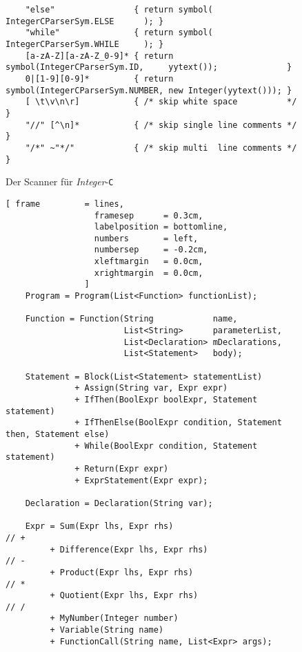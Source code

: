 \begin{figure}[!ht]
\begin{Verbatim}
    "else"                { return symbol( IntegerCParserSym.ELSE      ); }
    "while"               { return symbol( IntegerCParserSym.WHILE     ); }   
    [a-zA-Z][a-zA-Z_0-9]* { return symbol(IntegerCParserSym.ID,     yytext());              }
    0|[1-9][0-9]*         { return symbol(IntegerCParserSym.NUMBER, new Integer(yytext())); }
    [ \t\v\n\r]           { /* skip white space          */ }   
    "//" [^\n]*           { /* skip single line comments */ }   
    "/*" ~"*/"            { /* skip multi  line comments */ }   
\end{Verbatim}
\vspace*{-0.3cm}
\caption{Der Scanner f\"ur \textsl{Integer}-\texttt{C}}
\label{fig:compiler.jflex}
\end{figure}


\begin{figure}[!ht]
\centering
\begin{Verbatim}[ frame         = lines, 
                  framesep      = 0.3cm, 
                  labelposition = bottomline,
                  numbers       = left,
                  numbersep     = -0.2cm,
                  xleftmargin   = 0.0cm,
                  xrightmargin  = 0.0cm,
                ]
    Program = Program(List<Function> functionList);
    
    Function = Function(String            name, 
                        List<String>      parameterList, 
                        List<Declaration> mDeclarations,
                        List<Statement>   body);
    
    Statement = Block(List<Statement> statementList)
              + Assign(String var, Expr expr)
              + IfThen(BoolExpr boolExpr, Statement statement)
              + IfThenElse(BoolExpr condition, Statement then, Statement else)
              + While(BoolExpr condition, Statement statement)
              + Return(Expr expr)
              + ExprStatement(Expr expr);
    
    Declaration = Declaration(String var);
    
    Expr = Sum(Expr lhs, Expr rhs)                        // +
         + Difference(Expr lhs, Expr rhs)                 // -
         + Product(Expr lhs, Expr rhs)                    // *
         + Quotient(Expr lhs, Expr rhs)                   // /
         + MyNumber(Integer number)                       
         + Variable(String name)
         + FunctionCall(String name, List<Expr> args);
    

\end{Verbatim}
\end{figure}
